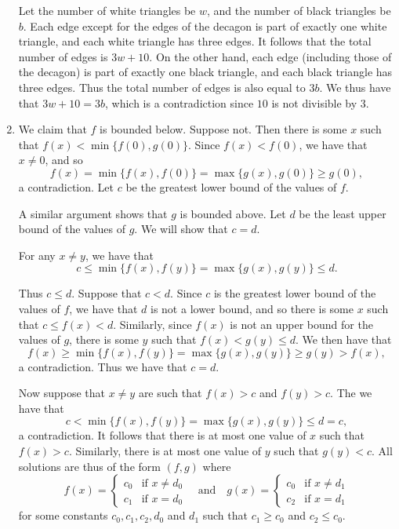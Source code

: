 \documentclass[12pt]{article}
\begin{document}
\begin{enumerate}
%
Let the number of white triangles be $w$, and the number of black triangles be
$b$. Each edge except for the edges of the decagon is part of exactly one white
triangle, and each white triangle has three edges. It follows that the total
number of edges is $3w + 10$. On the other hand, each edge (including those of
the decagon) is part of exactly one black triangle, and each black triangle has
three edges. Thus the total number of edges is also equal to $3b$. We thus have
that $3w + 10 = 3b$, which is a contradiction since $10$ is not divisible by
$3$.


\item %
We claim that $f$ is bounded below. Suppose not. Then there is some $x$ such
that $f(x) < \min\{f(0), g(0) \}$. Since $f(x) < f(0)$, we have that $x \neq 0$,
and so
\[
    f(x) = \min\{ f(x), f(0) \} = \max\{ g(x), g(0) \} \geq g(0),
\]
a contradiction. Let $c$ be the greatest lower bound of the values of $f$.

A similar argument shows that $g$ is bounded above. Let $d$ be the least upper
bound of the values of $g$. We will show that $c = d$.

For any $x \neq y$, we have that
\[
    c \leq \min\{ f(x), f(y) \} = \max\{ g(x), g(y) \} \leq d.   
\]

Thus $c \leq d$. Suppose that $c < d$. Since $c$ is the greatest lower bound of
the values of $f$, we have that $d$ is not a lower bound, and so there is some
$x$ such that $c \leq f(x) < d$. Similarly, since $f(x)$ is not an upper bound
for the values of $g$, there is some $y$ such that $f(x) < g(y) \leq d$. We then
have that
\[
    f(x) \geq \min\{ f(x), f(y) \} = \max\{ g(x), g(y) \} \geq g(y) > f(x),
\]
a contradiction. Thus we have that $c = d$.

Now suppose that $x \neq y$ are such that $f(x) > c$ and $f(y) > c$. The we have
that
\[
    c < \min\{ f(x), f(y) \} = \max\{ g(x), g(y) \} \leq d = c,
\]
a contradiction. It follows that there is at most one value of $x$ such that
$f(x) > c$. Similarly, there is at most one value of $y$ such that $g(y) < c$.
All solutions are thus of the form $(f, g)$ where
\[
    f(x) = \begin{cases} c_0 & \text{if } x \neq d_0 \\
        c_1 & \text{if } x = d_0
    \end{cases}
    \quad \text{and} \quad
    g(x) = \begin{cases} c_0 & \text{if } x \neq d_1 \\
        c_2 & \text{if } x = d_1
    \end{cases}
\]
for some constants $c_0, c_1, c_2, d_0$ and $d_1$ such that $c_1 \geq c_0$ and
$c_2 \leq c_0$.


\end{enumerate}
\end{document}
